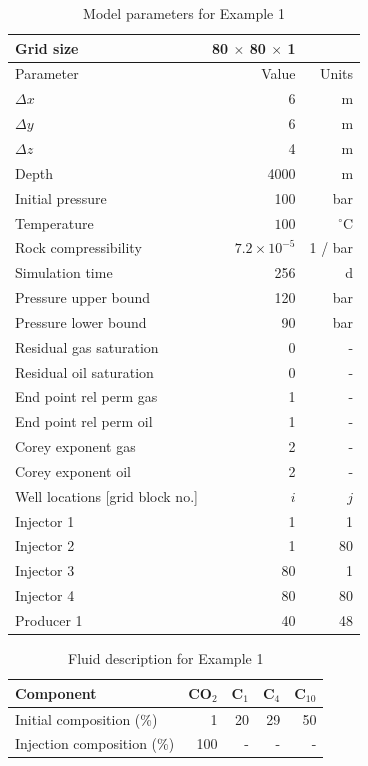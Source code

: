 \documentclass[twocolumn,numbook]{svjour3}          %
\begin{document}
\begin{table}
\centering
\caption{Model parameters for Example 1}
\begin{tabular}{|l|rr|}
\hline
Grid size                & 80 $\times$ 80 $\times$ 1 &       \\
\hline\hline
Parameter                & Value    & Units \\
\hline
$\Delta x$               & 6 &m          \\
$\Delta y$               & 6 &m          \\
$\Delta z$               & 4&m         \\
Depth                    & 4000&m           \\
Initial pressure         & 100  & bar        \\
Temperature              &$100$ & $^\circ$C     \\
\hline
Rock compressibility     & $7.2 \times 10^{-5}$ & 1 / bar \\
Simulation time          &256 & d          \\
Pressure upper bound     & 120 & bar        \\
Pressure lower bound     &  90 & bar        \\
\hline
Residual gas saturation  & 0 & -            \\
Residual oil saturation  & 0 & -            \\
End point rel perm gas   & 1 & -            \\
End point rel perm oil   & 1 & -            \\
Corey exponent gas       & 2 & -            \\
Corey exponent oil       & 2 & -            \\
\hline\hline
Well locations [grid block no.] & $i$ & $j$     \\
\hline
Injector 1               &   1&  1   \\
Injector 2               &   1& 80   \\
Injector 3               &  80&  1   \\
Injector 4               &  80& 80   \\
Producer 1               &  40& 48   \\
\hline
\end{tabular}
\label{table:PI}
\end{table}

\begin{table}
\centering
\caption{Fluid description for Example 1}
\begin{tabular}{|l|r|r|r|r|}
\hline
Component            & CO$_2$ & C$_1$ & C$_4$ & C$_{10}$    \\
\hline
Initial composition (\%)  & 1    & 20  & 29    & 50 \\
Injection composition (\%)& 100   & - & - & - \\
\hline
\end{tabular}
\label{table:fluidForPImodel}
\end{table}
\end{document}
